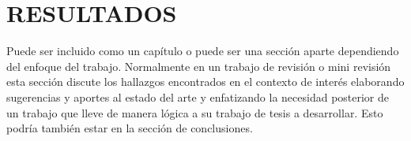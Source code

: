 \chapter{RESULTADOS}

Puede ser incluido como un capítulo o puede ser una sección aparte dependiendo del enfoque del trabajo. Normalmente en un trabajo de revisión o mini revisión esta sección discute los hallazgos encontrados en el contexto de interés elaborando sugerencias y aportes al estado del arte y enfatizando la necesidad posterior de un trabajo que lleve de manera lógica a su trabajo de tesis a desarrollar. Esto podría también estar en la sección de conclusiones.
